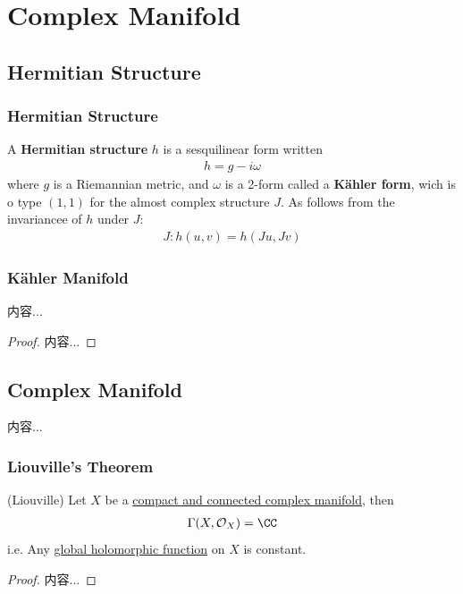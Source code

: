 \documentclass[Total.tex]{subfiles}
\begin{document}
		\section{Complex Manifold}
			\subsection{Hermitian Structure}
				\subsubsection{Hermitian Structure}
				\begin{Def}
					A \textbf{Hermitian structure} $h$ is a sesquilinear form written
					\begin{gather*}
						h=g-i\omega
					\end{gather*}
					where $g$ is a Riemannian metric, and $\omega$ is a 2-form called a \textbf{Kähler form}, wich is o type $(1,1)$ for the almost complex structure $J$. As follows from the invariancee of $h$ under $J$:
					\begin{gather*}
						J:h(u,v)=h(Ju,Jv)
					\end{gather*}
				\end{Def}
				\subsubsection{Kähler Manifold}
				
				\begin{theorem}
					内容...
				\end{theorem}
				\begin{proof}
					内容...
				\end{proof}
			\subsection{Complex Manifold}
				\begin{Def}
					内容...
				\end{Def}
				\subsubsection{Liouville's Theorem}
					\begin{theorem}
						(Liouville) Let $X$ be a \underline{compact and connected complex manifold}, then
						\begin{gather*}
							\Gamma(X,\mathcal{O}_X)=\CC
						\end{gather*}
						i.e. Any \underline{global holomorphic function} on $X$ is constant.
					\end{theorem}
					\begin{proof}
						内容...
					\end{proof}
					
\end{document}
